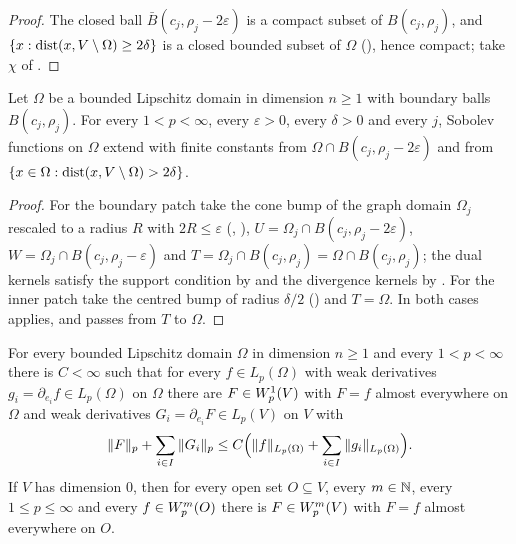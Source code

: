 \begin{proof}
\leanok
The closed ball $\bar B(c_j, \rho_j - 2 \varepsilon)$ is a compact subset of $B(c_j, \rho_j)$, and
$\{x : \operatorname{dist}(x, V \setminus \Omega) \geq 2 \delta\}$ is a closed bounded subset of $\Omega$
(), hence compact; take $\chi$ of .
\end{proof}

\begin{lemma}
\label{lem:sobolev-patches}
\leanok
{}
Let $\Omega$ be a bounded Lipschitz domain in dimension $n \geq 1$ with boundary balls
$B(c_j, \rho_j)$. For every $1 < p < \infty$, every $\varepsilon > 0$, every $\delta > 0$ and
every $j$, Sobolev functions on $\Omega$ extend with finite constants from
$\Omega \cap B(c_j, \rho_j - 2 \varepsilon)$ and from
$\{x \in \Omega : \operatorname{dist}(x, V \setminus \Omega) > 2 \delta\}$.
\end{lemma}

\begin{proof}
\leanok
For the boundary patch take the cone bump of the graph
domain $\Omega_j$ rescaled to a radius $R$ with $2R \leq \varepsilon$ (,
), $U = \Omega_j \cap B(c_j, \rho_j - 2\varepsilon)$,
$W = \Omega_j \cap B(c_j, \rho_j - \varepsilon)$ and $T = \Omega_j \cap B(c_j, \rho_j)
= \Omega \cap B(c_j, \rho_j)$; the dual kernels satisfy the support condition by
 and the divergence kernels by . For the
inner patch take the centred bump of radius $\delta/2$ () and
$T = \Omega$. In both cases
 applies, and  passes from $T$ to
$\Omega$.
\end{proof}

\begin{theorem}
\label{thm:sobolev-extension}
\leanok
{}
For every bounded Lipschitz domain $\Omega$ in dimension $n \geq 1$ and every $1 < p < \infty$
there is $C < \infty$ such that for every $f \in L_p(\Omega)$ with weak derivatives
$g_i = \partial_{e_i} f \in L_p(\Omega)$ on $\Omega$ there are $F \in W^{1}_{p}(V)$ with $F = f$
almost everywhere on $\Omega$ and weak derivatives $G_i = \partial_{e_i} F \in L_p(V)$ on $V$
with
\[
  \|F\|_p + \sum_{i \in I} \|G_i\|_p \leq C \Bigl(\|f\|_{L_p(\Omega)} + \sum_{i \in I}
  \|g_i\|_{L_p(\Omega)}\Bigr) .
\]
If $V$ has dimension $0$, then for every open set $O \subseteq V$, every $m \in \mathbb{N}$, every
$1 \leq p \leq \infty$ and every $f \in W^{m}_{p}(O)$ there is $F \in W^{m}_{p}(V)$ with $F = f$
almost everywhere on $O$.
\end{theorem}

